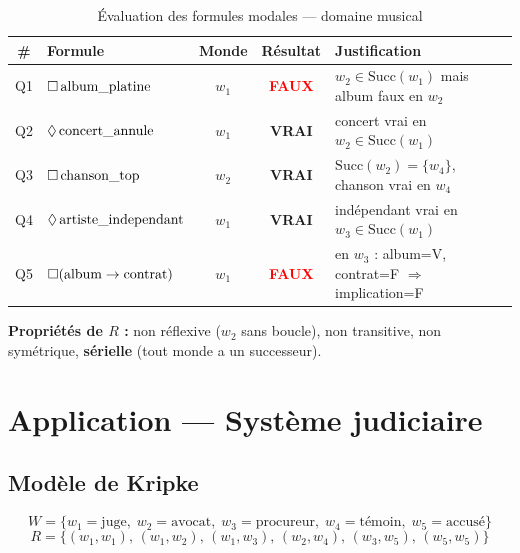\begin{table}[H]
\centering
\caption{Évaluation des formules modales — domaine musical}
\begin{tabularx}{\linewidth}{clccX}
\toprule
\textbf{\#} & \textbf{Formule} & \textbf{Monde} & \textbf{Résultat} & \textbf{Justification} \\
\midrule
Q1 & $\Box\,\text{album\_platine}$ & $w_1$ & \textcolor{red}{\textbf{FAUX}}
   & $w_2 \in \mathrm{Succ}(w_1)$ mais album faux en $w_2$ \\
Q2 & $\Diamond\,\text{concert\_annule}$ & $w_1$ & \textcolor{codegreen}{\textbf{VRAI}}
   & concert vrai en $w_2 \in \mathrm{Succ}(w_1)$ \\
Q3 & $\Box\,\text{chanson\_top}$ & $w_2$ & \textcolor{codegreen}{\textbf{VRAI}}
   & $\mathrm{Succ}(w_2) = \{w_4\}$, chanson vrai en $w_4$ \\
Q4 & $\Diamond\,\text{artiste\_independant}$ & $w_1$ & \textcolor{codegreen}{\textbf{VRAI}}
   & indépendant vrai en $w_3 \in \mathrm{Succ}(w_1)$ \\
Q5 & $\Box(\text{album} \to \text{contrat})$ & $w_1$ & \textcolor{red}{\textbf{FAUX}}
   & en $w_3$ : album=V, contrat=F $\Rightarrow$ implication=F \\
\bottomrule
\end{tabularx}
\end{table}

\noindent\textbf{Propriétés de $R$ :} non réflexive ($w_2$ sans boucle),
non transitive, non symétrique, \textbf{sérielle} (tout monde a un successeur).

\section{Application — Système judiciaire}

\subsection{Modèle de Kripke}

\[
  W = \{w_1=\text{juge},\; w_2=\text{avocat},\; w_3=\text{procureur},\;
        w_4=\text{témoin},\; w_5=\text{accusé}\}
\]
\[
  R = \{(w_1,w_1),\,(w_1,w_2),\,(w_1,w_3),\,(w_2,w_4),\,(w_3,w_5),\,(w_5,w_5)\}
\]

